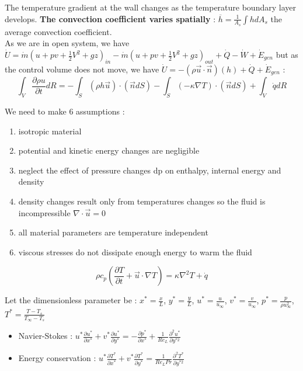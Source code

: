 \documentclass[../main.tex]{subfiles}
\begin{document}
The temperature gradient at the wall changes as the temperature boundary layer develops. \textbf{The convection coefficient varies spatially} : $\overline{h} = \frac{1}{A_s} \int h dA_s$ the average convection coefficient.\\

As we are in open system, we have $\dot{U} = \dot{m}(u+pv+\frac{1}{2}V^2 + gz)_{in} - \dot{m} (u+pv + \frac{1}{2}V^2 + gz)_{out} + \dot{Q} - \dot{W} + \dot{E}_{gen}$ but as the control volume does not move, we have $\dot{U} = -(\rho \Vec{u}\cdot \Vec{n}) (h) + \dot{Q} + \dot{E}_{gen}$ : \begin{equation}
    \int_V \frac{\partial \rho u}{\partial t}dR = -\int_S (\rho h \Vec{u})\cdot (\Vec{n} dS) - \int_S (-\kappa \nabla T)\cdot(\Vec{n}dS) + \int_V \dot{q}dR
\end{equation}

We need to make 6 assumptions : \begin{enumerate}
    \item isotropic material\\
    \item potential and kinetic energy changes are negligible\\
    \item neglect the effect of pressure changes dp on enthalpy, internal energy and density\\
    \item density changes result only from temperatures changes so the fluid is incompressible $\nabla \cdot \Vec{u} = 0$\\
    \item all material parameters are temperature independent\\
    \item viscous stresses do not dissipate enough energy to warm the fluid\\
\end{enumerate}

\begin{equation}
    \rho c_p(\frac{\partial T}{\partial t} + \Vec{u}\cdot \nabla T) = \kappa \nabla^2 T + \dot{q}
\end{equation}

Let the dimensionless parameter be : $x^* = \frac{x}{L}$, $y^* = \frac{y}{L}$, $u^* = \frac{u}{u_\infty}$, $v^* = \frac{v}{u_\infty}$, $p^* = \frac{p}{\rho u_\infty^2}$, $T^* = \frac{T-T_s}{T_\infty-T_s}$\\

\begin{itemize}
    \item Navier-Stokes : $u^* \frac{\partial u^*}{\partial x^*} + v^* \frac{\partial u^*}{\partial y^*} = -\frac{\partial p^*}{\partial x^*} + \frac{1}{Re_L} \frac{\partial^2 u^*}{\partial y^{*2}}$\\
    \item Energy conservation : $u^* \frac{\partial T^*}{\partial x^*} + v^* \frac{\partial T^*}{\partial y^*} = \frac{1}{Re_L Pr} \frac{\partial^2 T^*}{\partial y^{*2}}$\\
\end{itemize}
\end{document}
